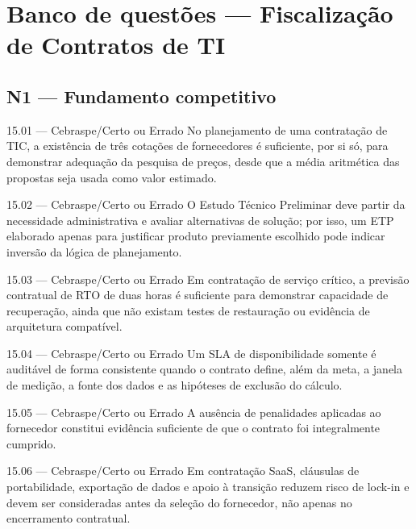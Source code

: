 \section{Banco de questões — Fiscalização de Contratos de TI}

\subsection*{N1 — Fundamento competitivo}

\begin{questao}{ 15.01 — Cebraspe/Certo ou Errado}
No planejamento de uma contratação de TIC, a existência de três cotações de fornecedores é suficiente, por si só, para demonstrar adequação da pesquisa de preços, desde que a média aritmética das propostas seja usada como valor estimado.
\end{questao}

\begin{questao}{ 15.02 — Cebraspe/Certo ou Errado}
O Estudo Técnico Preliminar deve partir da necessidade administrativa e avaliar alternativas de solução; por isso, um ETP elaborado apenas para justificar produto previamente escolhido pode indicar inversão da lógica de planejamento.
\end{questao}

\begin{questao}{ 15.03 — Cebraspe/Certo ou Errado}
Em contratação de serviço crítico, a previsão contratual de RTO de duas horas é suficiente para demonstrar capacidade de recuperação, ainda que não existam testes de restauração ou evidência de arquitetura compatível.
\end{questao}

\begin{questao}{ 15.04 — Cebraspe/Certo ou Errado}
Um SLA de disponibilidade somente é auditável de forma consistente quando o contrato define, além da meta, a janela de medição, a fonte dos dados e as hipóteses de exclusão do cálculo.
\end{questao}

\begin{questao}{ 15.05 — Cebraspe/Certo ou Errado}
A ausência de penalidades aplicadas ao fornecedor constitui evidência suficiente de que o contrato foi integralmente cumprido.
\end{questao}

\begin{questao}{ 15.06 — Cebraspe/Certo ou Errado}
Em contratação SaaS, cláusulas de portabilidade, exportação de dados e apoio à transição reduzem risco de lock-in e devem ser consideradas antes da seleção do fornecedor, não apenas no encerramento contratual.
\end{questao}

